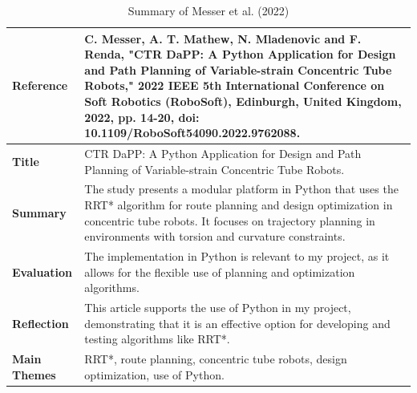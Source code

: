 \documentclass[a4paper,11pt]{report}
\begin{document}
\begin{table}[H]
    \centering
    \begin{tabular}{|p{3cm}|p{10cm}|}
        \hline
        \textbf{Reference} & C. Messer, A. T. Mathew, N. Mladenovic and F. Renda, "CTR DaPP: A Python Application for Design and Path Planning of Variable-strain Concentric Tube Robots," 2022 IEEE 5th International Conference on Soft Robotics (RoboSoft), Edinburgh, United Kingdom, 2022, pp. 14-20, doi: 10.1109/RoboSoft54090.2022.9762088. \\ \hline
        \textbf{Title} & CTR DaPP: A Python Application for Design and Path Planning of Variable-strain Concentric Tube Robots. \\ \hline
        \textbf{Summary} & The study presents a modular platform in Python that uses the RRT* algorithm for route planning and design optimization in concentric tube robots. It focuses on trajectory planning in environments with torsion and curvature constraints. \\ \hline
        \textbf{Evaluation} & The implementation in Python is relevant to my project, as it allows for the flexible use of planning and optimization algorithms. \\ \hline
        \textbf{Reflection} & This article supports the use of Python in my project, demonstrating that it is an effective option for developing and testing algorithms like RRT*. \\ \hline
        \textbf{Main Themes} & RRT*, route planning, concentric tube robots, design optimization, use of Python. \\ \hline
    \end{tabular}
    \caption{Summary of Messer et al. (2022)}
    \label{tab:messer2022}
\end{table}
\end{document}

